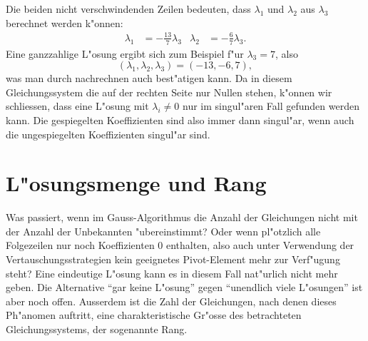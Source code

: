 \begin{beispiel}
Die beiden nicht verschwindenden Zeilen bedeuten, dass $\lambda_1$ und
$\lambda_2$ aus $\lambda_3$ berechnet werden k"onnen:
\begin{align*}
\lambda_1&=-\frac{13}7\lambda_3&\lambda_2&=-\frac{6}7\lambda_3.
\end{align*}
Eine ganzzahlige L"osung ergibt sich zum Beispiel f"ur $\lambda_3=7$,
also
$$
(
\lambda_1,
\lambda_2,
\lambda_3
)
=(
-13,-6,7
),
$$
was man durch nachrechnen auch best"atigen kann. Da in diesem Gleichungssystem
die auf der rechten Seite nur Nullen stehen, k"onnen wir schliessen,
dass eine L"osung mit $\lambda_i\ne 0$ nur im singul"aren Fall gefunden
werden kann. Die gespiegelten Koeffizienten sind also immer dann singul"ar,
wenn auch die ungespiegelten Koeffizienten singul"ar sind.
\end{beispiel}

\section{L"osungsmenge und Rang}
Was passiert, wenn im Gauss-Algorithmus die Anzahl der Gleichungen
nicht mit der Anzahl der Unbekannten "ubereinstimmt? Oder wenn
pl"otzlich alle Folgezeilen nur noch Koeffizienten $0$ enthalten,
also auch unter Verwendung der Vertauschungsstrategien kein geeignetes
Pivot-Element mehr zur Verf"ugung steht? Eine eindeutige L"osung kann
es in diesem Fall nat"urlich nicht mehr geben. Die Alternative
``gar keine L"osung'' gegen ``unendlich viele L"osungen'' ist aber
noch offen.
Ausserdem ist die Zahl der Gleichungen, nach denen dieses Ph"anomen
auftritt, eine charakteristische Gr"osse des betrachteten Gleichungssystems,
der sogenannte Rang.

